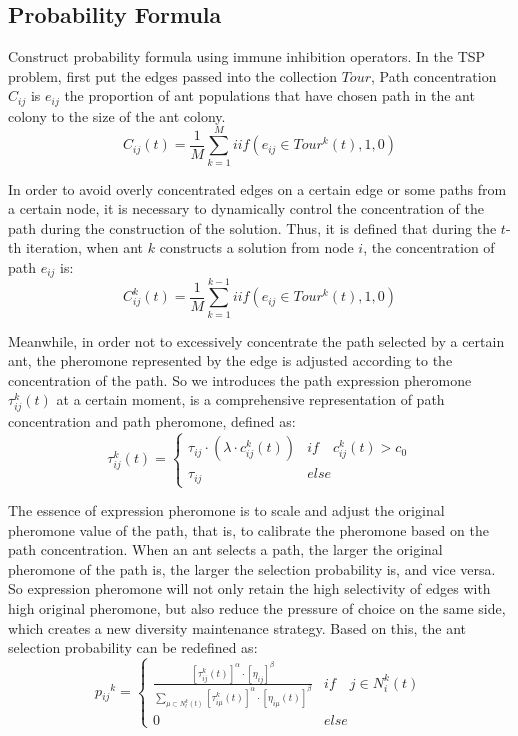 \documentclass[11pt,a4paper,oldfontcommands]{memoir}
\begin{document}
\subsection{Probability Formula}
Construct probability formula using immune inhibition operators.
In the TSP problem, first put the edges passed into the collection $Tour$, Path concentration $C_{ij}$ is $e_{ij}$ the proportion of ant populations that have chosen path  in the ant colony to the size of the ant colony. 
\begin{equation}
C_{ij}(t) = \frac{1}{M} \sum\limits_{k=1}^{M}iif \left(e_{ij} \in Tour^k(t),1,0\right)
\tag{12}
\end{equation}
\par
In order to avoid overly concentrated edges on a certain edge or some paths from a certain node, it is necessary to dynamically control the concentration of the path during the construction of the solution. Thus, it is defined that during the $t$-th iteration, when ant $k$ constructs a solution from node $i$, the concentration of path $e_{ij}$ is:
\begin{equation}
C_{ij}^k(t) = \frac{1}{M} \sum\limits_{k=1}^{k-1}iif \left(e_{ij} \in Tour^k(t),1,0\right)
\tag{13}
\end{equation}
\par
Meanwhile, in order not to excessively concentrate the path selected by a certain ant, the pheromone represented by the edge is adjusted according to the concentration of the path. So we introduces the path expression pheromone $\tau_{ij}^k(t)$ at a certain moment, is a comprehensive representation of path concentration and path pheromone, defined as:
\begin{equation}
\tau_{ij}^k(t)=
\begin{cases}
\tau_{ij} \cdot \left(\lambda \cdot c_{ij}^k(t)\right) & if \quad c_{ij}^k(t) > c_0 \\
\tau_{ij} & else
\end{cases}
\tag{14}
\end{equation}
\par
The essence of expression pheromone is to scale and adjust the original pheromone value of the path, that is, to calibrate the pheromone based on the path concentration. When an ant selects a path, the larger the original pheromone of the path is, the larger the selection probability is, and vice versa. So expression pheromone will not only retain the high selectivity of edges with high original pheromone, but also reduce the pressure of choice on the same side, which creates a new diversity maintenance strategy. Based on this, the ant selection probability can be redefined as:
\begin{equation}
p{_{ij}}^{k} =
\begin{cases}
\frac{[\tau_{ij}^k(t)]^\alpha \cdot [\eta_{ij}]^\beta} { \sum\limits_{\mu \subset N^k_l(t)} [\tau_{i\mu}^k(t)]^\alpha \cdot [\eta_{i\mu}(t)]^\beta} & if \quad j \in N^k_i(t) \\
0 & else
\end{cases}
\tag{15}
\end{equation}
\end{document}
